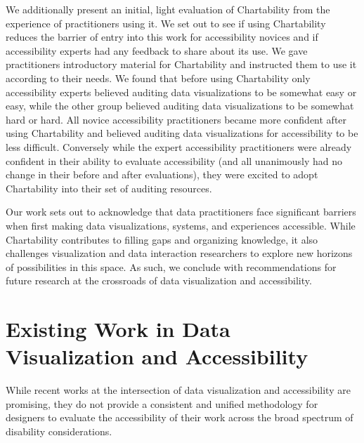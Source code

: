 \documentclass{egpubl}
\begin{document}
We additionally present an initial, light evaluation of Chartability from the experience of practitioners using it. We set out to see if using Chartability reduces the barrier of entry into this work for accessibility novices and if accessibility experts had any feedback to share about its use. We gave practitioners introductory material for Chartability and instructed them to use it according to their needs. We found that before using Chartability only accessibility experts believed auditing data visualizations to be somewhat easy or easy, while the other group believed auditing data visualizations to be somewhat hard or hard. All novice accessibility practitioners became more confident after using Chartability and believed auditing data visualizations for accessibility to be less difficult. Conversely while the expert accessibility practitioners were already confident in their ability to evaluate accessibility (and all unanimously had no change in their before and after evaluations), they were excited to adopt Chartability into their set of auditing resources. 

Our work sets out to acknowledge that data practitioners face significant barriers when first making data visualizations, systems, and experiences accessible. While Chartability contributes to filling gaps and organizing knowledge, it also challenges visualization and data interaction researchers to explore new horizons of possibilities in this space. As such, we conclude with recommendations for future research at the crossroads of data visualization and accessibility. 

\section{Existing Work in Data Visualization and Accessibility}

While recent works at the intersection of data visualization and accessibility are promising, they do not provide a consistent and unified methodology for designers to evaluate the accessibility of their work across the broad spectrum of disability considerations.
\end{document}
